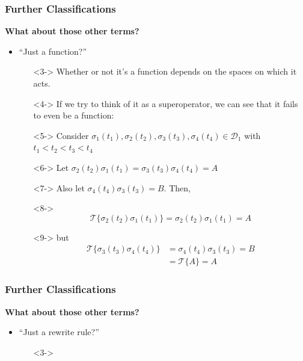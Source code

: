 \documentclass{beamer}
\begin{document}
\begin{frame}
    \frametitle{Further Classifications}
    \alert{\textbf{What about those other terms?}}
    \begin{itemize}
        \item<2-> ``Just a function?''
        \begin{itemize}
            \item[\textbullet]<3-> Whether or not it's a function depends on the spaces on which it acts.
            \item[\textbullet]<4-> If we try to think of it as a superoperator, we can see that it fails to even be a function:
            \item[\textbullet]<5-> Consider $\sigma_1(t_1), \sigma_2(t_2), \sigma_3(t_3), \sigma_4(t_4) \in \mathcal{D}_1$ with $t_1<t_2<t_3<t_4$
            \item[\textbullet]<6-> Let $\sigma_2(t_2)\sigma_1(t_1) = \sigma_3(t_3)\sigma_4(t_4) = A$
            \item[\textbullet]<7-> Also let $\sigma_4(t_4)\sigma_3(t_3) = B$. Then,
            \item[]<8-> \[ \mathscr{T}\{\sigma_2(t_2)\sigma_1(t_1)\} = \sigma_2(t_2)\sigma_1(t_1) = A \] 
            \item[]<9-> but \begin{align*}
                \mathscr{T}\{\sigma_3(t_3)\sigma_4(t_4)\} &= \sigma_4(t_4)\sigma_3(t_3) = B \\
                &= \mathscr{T}\{A\} = A
            \end{align*}  
        \end{itemize}
    \end{itemize}
\end{frame}

\begin{frame}
    \frametitle{Further Classifications}
    \alert{\textbf{What about those other terms?}}
    \begin{itemize}
        \item<2-> ``Just a rewrite rule?''
        \begin{itemize}
            \item[\textbullet]<3->
        \end{itemize}
    \end{itemize}
\end{frame}
\end{document}
